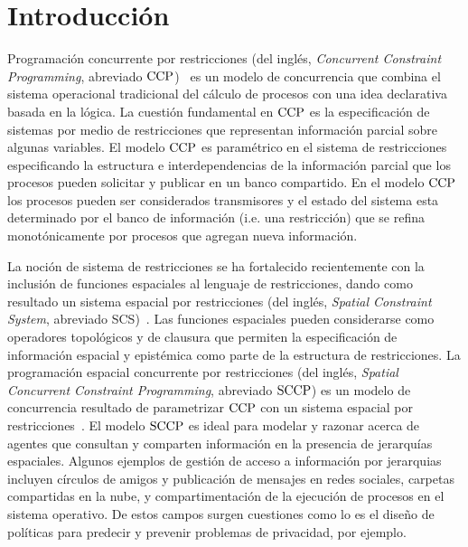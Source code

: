 
\chapter{Introducci\'on}
\label{cha.intro}

Programaci\'on concurrente por restricciones (del ingl\'es, \textit{Concurrent Constraint Programming}, abreviado $\textnormal{CCP}$)~\cite{DBLP:conf/popl/SaraswatR90,semantic-ccp,cp-book} es un modelo de concurrencia que combina el sistema operacional tradicional del c\'alculo de procesos con una idea declarativa basada en la l\'ogica. La cuesti\'on fundamental en $\textnormal{CCP}$ es la especificaci\'on de sistemas por medio de restricciones que representan informaci\'on parcial sobre algunas variables. El modelo $\textnormal{CCP}$ es param\'etrico en el sistema de restricciones especificando la estructura e interdependencias de la informaci\'on parcial que los procesos pueden solicitar y publicar en un banco compartido. En el modelo  $\textnormal{CCP}$ los procesos pueden ser considerados transmisores y el estado del sistema esta determinado por el banco de informaci\'on (i.e. una restricci\'on) que se refina monot\'onicamente por procesos que agregan nueva informaci\'on.

La noci\'on de sistema de restricciones se ha fortalecido recientemente con la inclusi\'on de funciones espaciales al lenguaje de restricciones, dando como resultado un sistema espacial por restricciones (del ingl\'es, \textit{Spatial Constraint System}, abreviado SCS)~\cite{knight:hal-00761116}. Las funciones espaciales pueden considerarse como operadores topol\'ogicos y de clausura que permiten la especificaci\'on de informaci\'on espacial y epist\'emica como parte de la estructura de restricciones. La programaci\'on espacial concurrente por restricciones (del ingl\'es, \textit{Spatial Concurrent Constraint Programming}, abreviado $\textnormal{SCCP}$) es un modelo de concurrencia resultado de parametrizar $\textnormal{CCP}$ con un sistema espacial por restricciones~\cite{knight:hal-00761116}. El modelo $\textnormal{SCCP}$ es ideal para modelar y razonar acerca de agentes que consultan y comparten informaci\'on en la presencia de jerarqu\'ias espaciales. Algunos ejemplos de gesti\'on de acceso a informaci\'on por jerarquias incluyen c\'irculos de amigos y publicaci\'on de mensajes en redes sociales, carpetas compartidas en la nube, y compartimentaci\'on de la ejecuci\'on de procesos en el sistema operativo. De estos campos surgen cuestiones como lo es el dise\~no de pol\'iticas para predecir y prevenir problemas de privacidad, por ejemplo.

